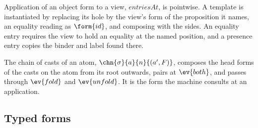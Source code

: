 Application of an object form to a view, $\mathit{entriesAt}$, is pointwise. A template is instantiated by replacing its hole by the view's form of the proposition it names, an equality reading as $\form{id}$, and composing with the sides. An equality entry requires the view to hold an equality at the named position, and a presence entry copies the binder and label found there.

The chain of casts of an atom, $\chn{\sigma}{a}{n}{(a', F)}$, composes the head forms of the casts on the atom from its root outwards, pairs at $\ev{both}$, and passes through $\ev{fold}$ and $\ev{unfold}$. It is the form the machine consults at an application.

\subsection{Typed forms}


